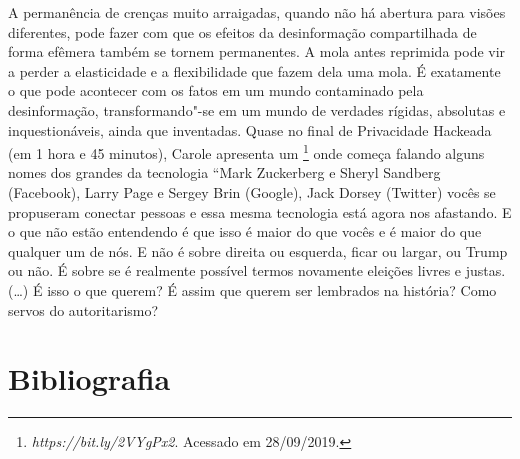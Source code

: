 A permanência de crenças muito arraigadas, quando não há abertura para
visões diferentes, pode fazer com que os efeitos da desinformação
compartilhada de forma efêmera também se tornem permanentes. A mola
antes reprimida pode vir a perder a elasticidade e a flexibilidade que
fazem dela uma mola. É exatamente o que pode acontecer com os fatos em
um mundo contaminado pela desinformação, transformando"-se em um mundo de
verdades rígidas, absolutas e inquestionáveis, ainda que inventadas.
Quase no final de Privacidade Hackeada (em 1 hora e 45 minutos), Carole
apresenta um \footnote{\emph{https://bit.ly/2VYgPx2}.
  Acessado em 28/09/2019.} onde começa falando alguns nomes dos grandes
da tecnologia ``Mark Zuckerberg e Sheryl Sandberg (Facebook), Larry Page
e Sergey Brin (Google), Jack Dorsey (Twitter) vocês se propuseram
conectar pessoas e essa mesma tecnologia está agora nos afastando. E o
que não estão entendendo é que isso é maior do que vocês e é maior do
que qualquer um de nós. E não é sobre direita ou esquerda, ficar ou
largar, ou Trump ou não. É sobre se é realmente possível termos
novamente eleições livres e justas. (\ldots{}) É isso o que querem? É assim
que querem ser lembrados na história? Como servos do autoritarismo?

\section{Bibliografia}

